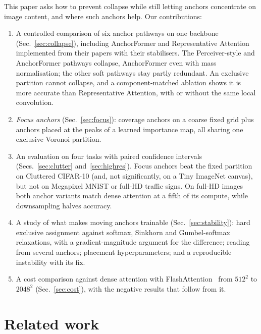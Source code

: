 \documentclass[runningheads]{llncs}
\begin{document}
This paper asks how to prevent collapse while still letting anchors concentrate on image
content, and where such anchors help. Our contributions:
\begin{enumerate}
\item A controlled comparison of six anchor pathways on one backbone (Sec.~\ref{sec:collapse}),
including AnchorFormer and Representative Attention implemented from their papers with their
stabilisers. The Perceiver-style and AnchorFormer pathways collapse, AnchorFormer even with mass
normalisation; the other soft pathways stay partly redundant. An exclusive partition cannot
collapse, and a component-matched
ablation shows it is more accurate than Representative Attention, with or without the same
local convolution.
\item \emph{Focus anchors} (Sec.~\ref{sec:focus}): coverage anchors on a coarse fixed grid plus
anchors placed at the peaks of a learned importance map, all sharing one exclusive Voronoi
partition.
\item An evaluation on four tasks with paired confidence intervals (Secs.~\ref{sec:clutter}
and~\ref{sec:highres}). Focus anchors beat the fixed partition on Cluttered CIFAR-10 (and, not
significantly, on a Tiny ImageNet canvas), but not on Megapixel MNIST or full-HD traffic signs.
On full-HD images both anchor variants match dense attention at a fifth of its compute, while
downsampling halves accuracy.
\item A study of what makes moving anchors trainable (Sec.~\ref{sec:stability}): hard
exclusive assignment against softmax, Sinkhorn and Gumbel-softmax relaxations, with a
gradient-magnitude argument for the difference; reading from several anchors; placement
hyperparameters; and a reproducible instability with its fix.
\item A cost comparison against dense attention with FlashAttention~\cite{dao2022flashattention}
from $512^2$ to $2048^2$ (Sec.~\ref{sec:cost}), with the negative results that follow from it.
\end{enumerate}

\section{Related work}
\end{document}
